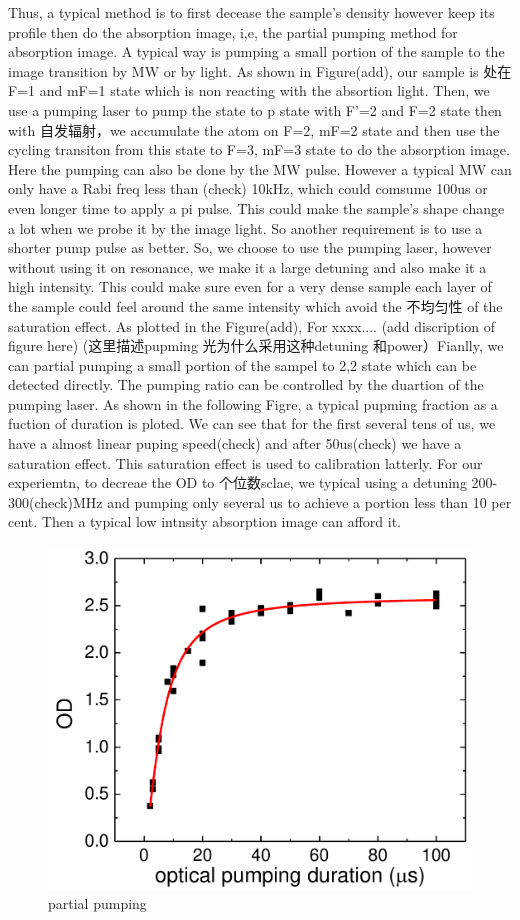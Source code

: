 Thus, a typical method is to first decease the sample's density however keep its profile then do the absorption image, i,e, the partial pumping method for absorption image. A typical way is pumping a small portion of the sample to the image transition by MW or by light. As shown in Figure(add), our sample is 处在 F=1 and mF=1 state which is non reacting with the absortion light. Then, we use a pumping laser to pump the state to p state with F'=2 and F=2 state then with 自发辐射，we accumulate the atom on F=2, mF=2 state and then use the cycling transiton from this state to F=3, mF=3 state to do the absorption image. Here the pumping can also be done by the MW pulse. However a typical MW can only have a Rabi freq less than (check) 10kHz, which could comsume 100us or even longer time to apply a pi pulse. This could make the sample's shape change a lot when we probe it by the image light. So another requirement is to use a shorter pump pulse as better. So, we choose to use the pumping laser, however without using it on resonance, we make it a large detuning and also make it a high intensity. This could make sure even for a very dense sample each layer of the sample could feel around the same intensity which avoid the 不均匀性 of the saturation effect. As plotted in the Figure(add), For xxxx.... (add discription of figure here) (这里描述pupming 光为什么采用这种detuning 和power）Fianlly, we can partial pumping a small portion of the sampel to 2,2 state which can be detected directly. The pumping ratio can be controlled by the duartion of the pumping laser. As shown in the following Figre, a typical pupming fraction as a fuction of duration is ploted. We can see that for the first several tens of us, we have a almost linear puping speed(check) and after 50us(check) we have a saturation effect. This saturation effect is used to calibration latterly. For our experiemtn, to decreae the OD to 个位数sclae, we typical using a detuning 200-300(check)MHz and pumping only several us to achieve a portion less than 10 per cent. Then a typical low intnsity absorption image can afford it.

\begin{figure}[hb]
\begin{center}
\includegraphics[width = 0.8\linewidth]{figures/partial_pumping.pdf}
\end{center}
\caption{partial pumping}
\label{partial_pumping}
\end{figure}

